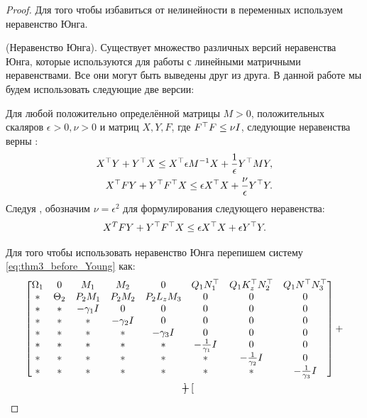 \begin{proof}
Для того чтобы избавиться от нелинейности в переменных используем неравенство Юнга.

	\begin{lemma}\label{lemma:Young}
		(Неравенство Юнга).
		Существует множество различных версий неравенства Юнга, которые используются для работы с линейными матричными неравенствами. Все они могут быть выведены друг из друга. В данной работе мы будем использовать следующие две версии:
		
		Для любой положительно определённой матрицы $M>0$, положительных скаляров $\epsilon > 0, \nu > 0$ и матриц ${X}, {Y}, {F}$, где ${F}^\top{F}\leq \nu{I}$, следующие неравенства верны \cite{BOYED1994}:
		\begin{align}
			\label{eq:Young_relation_BMI}
			{X}^\top{Y} + {Y}^\top{X}  \leq {X}^\top 
			\epsilon {M}^{-1}{X} + \frac{1}{\epsilon}   {Y}^\top  {M}{Y}, 
			\\
			\label{eq:Young_robust_2}
			{X}^\top{F}{Y} + {Y}^\top{F}^\top{X}  \leq \epsilon {X}^\top{X} +  \frac{\nu}{\epsilon} {Y}^\top {Y}.
		\end{align}
		Следуя \cite{LIEN2008}, обозначим $\nu=\epsilon^2$ для формулирования следующего неравенства:
		\begin{equation}
			\label{eq:updated_Young_robust_2}
			{X}^T{F}{Y} + {Y}^\top{F}^\top{X}  \leq \epsilon {X}^\top{X} + \epsilon {Y}^\top{Y}.
		\end{equation}
	\end{lemma}
	Для того чтобы использовать неравенство Юнга перепишем систему \eqref{eq:thm3_before_Young} как:
	\begin{multline}
	\label{eq:thm3_before_Young_2}
	\begin{bmatrix}
		{\Omega}_1 & 0 & {M}_1 & {M}_2 & 0& {Q}_1{N}_1^\top & {Q}_1{K}_z^\top{N}_2^\top & {Q}_1 {N}^\top{N}_3^\top 
		\\
		* & {\Theta}_2 & {P}_2{M}_1 & {P}_2{M}_2 & {P}_2{L}_z{M}_3 & 0 & 0 & 0\\
		* & * & -\gamma_1{I} & 0&0&0&0&0\\
		* & * & * & -\gamma_2{I}&0&0&0&0\\
		* & * & * & *&-\gamma_3{I}&0&0&0\\
		* & * & * & *&*&-\frac{1}{\gamma_1}{I}&0&0\\
		* & * & * & *&*&*&-\frac{1}{\gamma_2}{I}&0\\
		*&* & * & * & *&*&*&-\frac{1}{\gamma_3}{I}
	\end{bmatrix}
	+
	\\
	+\begin{bmatrix}

\end{bmatrix}
\end{multline}
\end{proof}
